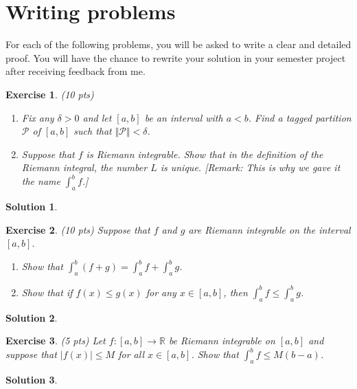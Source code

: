 \documentclass[12pt]{article}
\newcommand{\bR}{\mathbb{R}}
\newcommand{\cP}{\mathcal{P}}
\newcommand{\ra}{\rightarrow}
\theoremstyle{plain}
\newtheorem{exer}{\textbf{Exercise}}}
\theoremstyle{plain}
\newtheorem*{sol}{\textbf{Solution}}}
\begin{document}
\section{Writing problems}
For each of the following problems, you will be asked to write a clear and detailed proof. You will have the chance to rewrite your solution in your semester project after receiving feedback from me.

\begin{exer}
(10 pts)
\begin{enumerate}[label=\textbf{\alph*)}]
\item Fix any $\delta > 0$ and let $[a, b]$ be an interval with $a < b$. Find a tagged partition $\cP$ of $[a, b]$ such that $\Vert \cP \Vert < \delta$.
\item Suppose that $f$ is Riemann integrable. Show that in the definition of the Riemann integral, the number $L$ is unique. [Remark: This is why we gave it the name $\int_a^b f$.]
\end{enumerate}
\end{exer}
\begin{sol}

\end{sol}

\begin{exer}
(10 pts)
Suppose that $f$ and $g$ are Riemann integrable on the interval $[a, b]$.
	\begin{enumerate}[label=\textbf{\alph*)}]
	\item Show that $\int_a^b (f + g) = \int_a^b f + \int_a^b g$.
	\item Show that if $f(x) \leq g(x)$ for any $x \in [a, b]$, then $\int_a^b f \leq \int_a^b g$.
	\end{enumerate}
\end{exer}
\begin{sol}

\end{sol}

\begin{exer}
(5 pts)
Let $f : [a, b] \ra \bR$ be Riemann integrable on $[a, b]$ and suppose that $|f(x)| \leq M$ for all $x \in [a, b]$. Show that $\int_a^b f \leq M (b - a)$.
\end{exer}
\begin{sol}

\end{sol}
\end{document}
